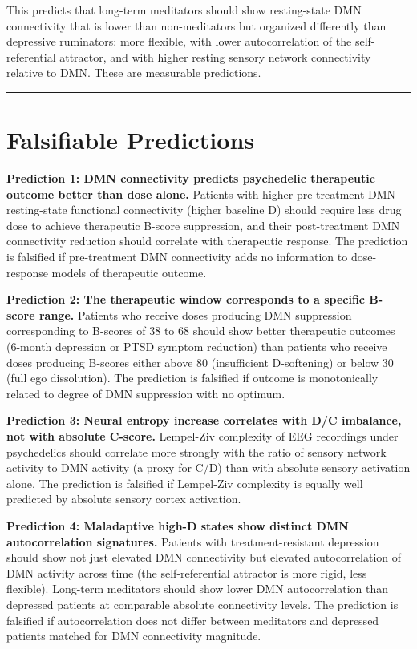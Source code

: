 \documentclass[12pt]{article}
\begin{document}
This predicts that long-term meditators should show resting-state DMN
connectivity that is lower than non-meditators but organized differently
than depressive ruminators: more flexible, with lower autocorrelation of
the self-referential attractor, and with higher resting sensory network
connectivity relative to DMN. These are measurable predictions.

\begin{center}\rule{0.5\linewidth}{0.5pt}\end{center}

\section{Falsifiable Predictions}\label{falsifiable-predictions}

\textbf{Prediction 1: DMN connectivity predicts psychedelic therapeutic
outcome better than dose alone.} Patients with higher pre-treatment DMN
resting-state functional connectivity (higher baseline D) should require
less drug dose to achieve therapeutic B-score suppression, and their
post-treatment DMN connectivity reduction should correlate with
therapeutic response. The prediction is falsified if pre-treatment DMN
connectivity adds no information to dose-response models of therapeutic
outcome.

\textbf{Prediction 2: The therapeutic window corresponds to a specific
B-score range.} Patients who receive doses producing DMN suppression
corresponding to B-scores of 38 to 68 should show better therapeutic
outcomes (6-month depression or PTSD symptom reduction) than patients
who receive doses producing B-scores either above 80 (insufficient
D-softening) or below 30 (full ego dissolution). The prediction is
falsified if outcome is monotonically related to degree of DMN
suppression with no optimum.

\textbf{Prediction 3: Neural entropy increase correlates with D/C
imbalance, not with absolute C-score.} Lempel-Ziv complexity of EEG
recordings under psychedelics should correlate more strongly with the
ratio of sensory network activity to DMN activity (a proxy for C/D) than
with absolute sensory activation alone. The prediction is falsified if
Lempel-Ziv complexity is equally well predicted by absolute sensory
cortex activation.

\textbf{Prediction 4: Maladaptive high-D states show distinct DMN
autocorrelation signatures.} Patients with treatment-resistant
depression should show not just elevated DMN connectivity but elevated
autocorrelation of DMN activity across time (the self-referential
attractor is more rigid, less flexible). Long-term meditators should
show lower DMN autocorrelation than depressed patients at comparable
absolute connectivity levels. The prediction is falsified if
autocorrelation does not differ between meditators and depressed
patients matched for DMN connectivity magnitude.
\end{document}
